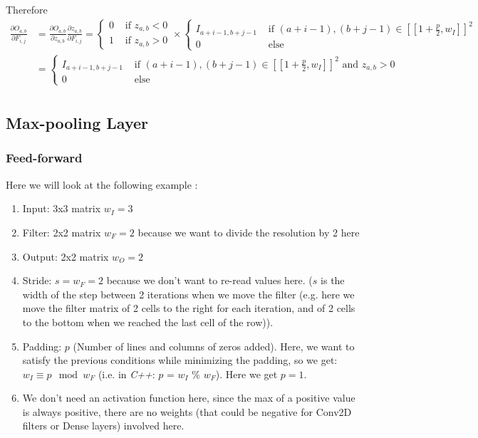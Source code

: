 \documentclass[11pt,a4paper]{report}
\begin{document}
Therefore
\begin{equation}
\begin{split}
    \frac{\partial O_{a,b}}{\partial F_{i,j}} &= \frac{\partial O_{a,b}}{\partial z_{a,b}} \frac{\partial z_{a,b}}{\partial F_{i,j}}   = \begin{cases}
    0 & \text{ if } z_{a,b} < 0\\
    1 & \text{ if } z_{a,b} > 0
\end{cases} \times \begin{cases}
        I_{a+i-1,b+j-1} &\text{ if } (a+i-1),(b+j-1) \in [\![1+\frac{p}{2},w_I]\!]^2\\
        0 &\text{ else}
    \end{cases}\\
&= \begin{cases}
        I_{a+i-1,b+j-1} &\text{ if } (a+i-1),(b+j-1) \in [\![1+\frac{p}{2},w_I]\!]^2 \text{ and } z_{a,b} > 0 \\
        0 &\text{ else}
    \end{cases}\\
\end{split}
\end{equation}


\newpage
\subsection{Max-pooling Layer}
\subsubsection{Feed-forward}

Here we will look at the following example :
\begin{enumerate}
    \item Input: 3x3 matrix $w_I = 3$
    \item Filter: 2x2 matrix $w_F = 2$ because we want to divide the resolution by 2 here
    \item Output: 2x2 matrix $w_O = 2$
    \item Stride: $s = w_F = 2$ because we don't want to re-read values here. ($s$ is the width of the step between 2 iterations when we move the filter (e.g. here we move the filter matrix of 2 cells to the right for each iteration, and of 2 cells to the bottom when we reached the last cell of the row)).
    \item Padding: $p$ (Number of lines and columns of zeros added). Here, we want to satisfy the previous conditions while minimizing the padding, so we get: $w_I \equiv p \mod{w_F}$ (i.e. in \textit{C++}: $p$ = $w_I$ \% $w_F$).
    Here we get $p = 1$.
    \item We don't need an activation function here, since the max of a positive value is always positive, there are no weights (that could be negative for Conv2D filters or Dense layers) involved here.
\end{enumerate}
\end{document}
